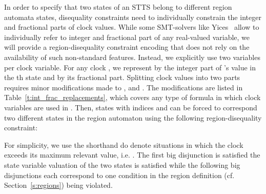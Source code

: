 In order to specify that two states of an STTS belong to different region automata states, disequality constraints need to individually constrain the integer and fractional parts of clock values. While some SMT-solvers like Yices \tocite\ allow to individually refer to integer and fractional part of any real-valued variable, we will provide a region-disequality constraint encoding that does not rely on the availability of such non-standard features. Instead, we explicitly use two variables per clock variable. For any clock , we represent by  the integer part of 's value in the th state and by  its fractional part. Splitting clock values into two parts requires minor modifications made to ,  and . The modifications are listed in Table~\ref{t:int_frac_replacements}, which covers any type of formula in which clock variables are used in \aExpsttsTerm. 
Then, states with indices  and  can be forced to correspond two different states in the region automaton using the following region-disequality constraint:

 For simplicity, we use the shorthand  do denote situations in which the clock  exceeds its maximum relevant value, i.e.
.
The first big disjunction is satisfied the state variable valuation of the two states is satisfied while the following big disjunctions each correspond to one condition in the region definition (cf. Section~\ref{s:regions}) being violated.
\fi
